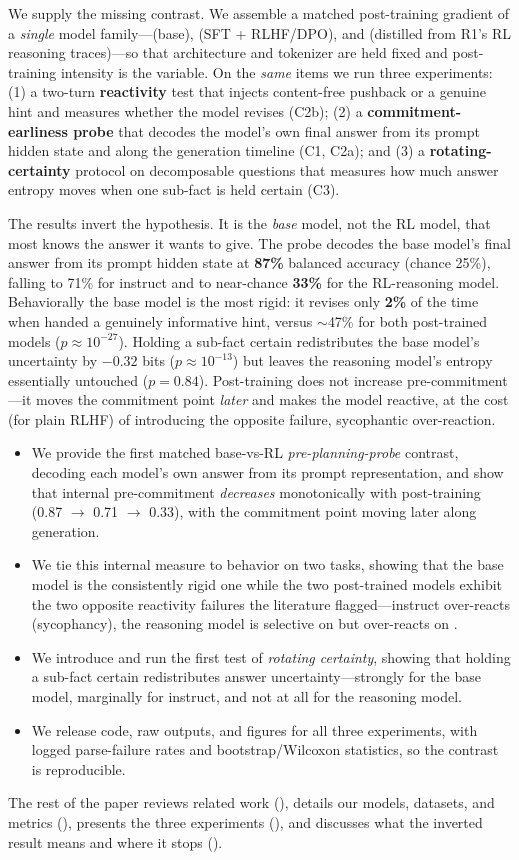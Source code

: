  We supply the missing contrast. We assemble a matched post-training
gradient of a \emph{single} model family---\qwenbase (base), \qweninst (SFT + RLHF/DPO), and
\rdistill (distilled from R1's RL reasoning traces)---so that architecture and tokenizer are
held fixed and post-training intensity is the variable. On the \emph{same} items we run three
experiments: (1) a two-turn \textbf{reactivity} test that injects content-free pushback or a
genuine hint and measures whether the model revises (C2b); (2) a \textbf{commitment-earliness
probe} that decodes the model's own final answer from its prompt hidden state and along the
generation timeline (C1, C2a); and (3) a \textbf{rotating-certainty} protocol on decomposable
\strat questions that measures how much answer entropy moves when one sub-fact is held certain
(C3).

 The results invert the hypothesis. It is the \emph{base} model, not the
RL model, that most knows the answer it wants to give. The probe decodes the base model's
final answer from its prompt hidden state at \textbf{87\%} balanced accuracy (chance 25\%),
falling to 71\% for instruct and to near-chance \textbf{33\%} for the RL-reasoning model.
Behaviorally the base model is the most rigid: it revises only \textbf{2\%} of the time when
handed a genuinely informative hint, versus $\sim$47\% for both post-trained models
($p\approx10^{-27}$). Holding a sub-fact certain redistributes the base model's uncertainty
by $-0.32$ bits ($p\approx10^{-13}$) but leaves the reasoning model's entropy essentially
untouched ($p=0.84$). Post-training does not increase pre-commitment---it moves the
commitment point \emph{later} and makes the model reactive, at the cost (for plain RLHF) of
introducing the opposite failure, sycophantic over-reaction.

\begin{itemize}[leftmargin=*,itemsep=0pt,topsep=2pt]
    \item We provide the first matched base-vs-RL \emph{pre-planning-probe} contrast,
    decoding each model's own answer from its prompt representation, and show that internal
    pre-commitment \emph{decreases} monotonically with post-training (0.87 $\rightarrow$ 0.71
    $\rightarrow$ 0.33), with the commitment point moving later along generation.
    \item We tie this internal measure to behavior on two tasks, showing that the base model
    is the consistently rigid one while the two post-trained models exhibit the two opposite
    reactivity failures the literature flagged---instruct over-reacts (sycophancy), the
    reasoning model is selective on \arc but over-reacts on \gsm.
    \item We introduce and run the first test of \emph{rotating certainty}, showing that
    holding a sub-fact certain redistributes answer uncertainty---strongly for the base
    model, marginally for instruct, and not at all for the reasoning model.
    \item We release code, raw outputs, and figures for all three experiments, with logged
    parse-failure rates and bootstrap/Wilcoxon statistics, so the contrast is reproducible.
\end{itemize}

The rest of the paper reviews related work (), details our models,
datasets, and metrics (), presents the three experiments
(), and discusses what the inverted result means and where it stops
().
